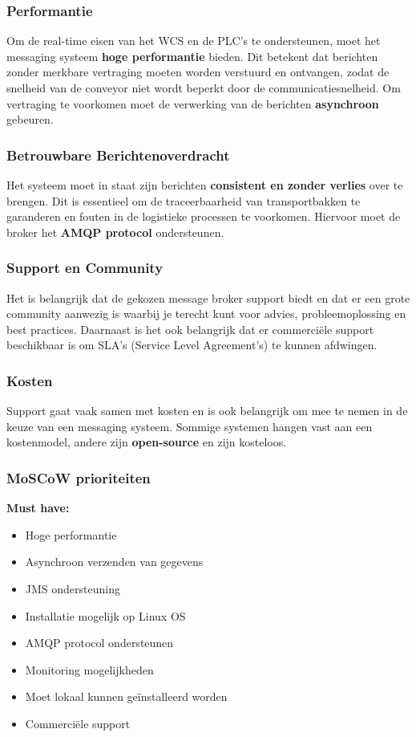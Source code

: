 \subsubsection{Performantie}
Om de real-time eisen van het WCS en de PLC’s te ondersteunen, moet het messaging systeem \textbf{hoge performantie} bieden. 
Dit betekent dat berichten zonder merkbare vertraging moeten worden verstuurd en ontvangen, 
zodat de snelheid van de conveyor niet wordt beperkt door de communicatiesnelheid.
Om vertraging te voorkomen moet de verwerking van de berichten \textbf{asynchroon} gebeuren.

\subsubsection{Betrouwbare Berichtenoverdracht}
Het systeem moet in staat zijn berichten \textbf{consistent en zonder verlies} over te brengen. 
Dit is essentieel om de traceerbaarheid van transportbakken te garanderen en fouten in de logistieke processen te voorkomen.
Hiervoor moet de broker het \textbf{AMQP protocol} ondersteunen.

\subsubsection{Support en Community}
Het is belangrijk dat de gekozen message broker support biedt en dat er een grote community aanwezig is 
waarbij je terecht kunt voor advies, probleemoplossing en best practices.
Daarnaast is het ook belangrijk dat er commerciële support beschikbaar is om SLA's (Service Level Agreement's) te kunnen afdwingen.

\subsubsection{Kosten}
Support gaat vaak samen met kosten en is ook belangrijk om mee te nemen in de keuze van een messaging systeem.
Sommige systemen hangen vast aan een kostenmodel, andere zijn \textbf{open-source} en zijn kosteloos.
\newpage
\subsubsection{MoSCoW prioriteiten}

\textbf{Must have:}
\begin{itemize}
\item Hoge performantie 
\item Asynchroon verzenden van gegevens  
\item JMS ondersteuning
\item Installatie mogelijk op Linux OS 
\item AMQP protocol ondersteunen 
\item Monitoring mogelijkheden
\item Moet lokaal kunnen geïnstalleerd worden
\item Commerciële support
\end{itemize}

